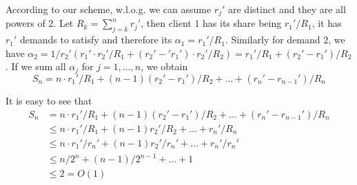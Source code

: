 \documentclass[11pt]{article}
\begin{document}
According to our scheme, w.l.o.g. we can assume $r_j'$ are distinct
and they are all powers of 2. Let $R_k = \sum_{j=k}^n r_j'$, then
client $1$ has its share being $r_1'/R_1$, it has $r_1'$ demands to
satisfy and therefore its $\alpha_1 = r_1'/R_1$. Similarly for demand
$2$, we have $\alpha_2 = 1/r_2' (r_1'\cdot r_2'/R_1 +
(r_2'-'r_1')\cdot r_2'/R_2) = r_1'/R_1 + (r_2'-r_1')/R_2$. If we sum
all $\alpha_j$ for $j=1,\ldots,n$, we obtain
\begin{equation}
S_n = n\cdot r_1'/R_1 + (n-1) (r_2'-r_1')/R_2 + \ldots + (r_n' -
r_{n-1}') / R_n
\end{equation}

It is easy to see that
\begin{align*}
S_n &= n\cdot r_1'/R_1 + (n-1) (r_2'-r_1')/R_2 + \ldots + (r_n' -
r_{n-1}') / R_n\\
&\leq n\cdot r_1'/R_1 + (n-1) r_2' / R_2 + \ldots + r_n' / R_n\\
&\leq n\cdot r_1'/r_n' + (n-1) r_2' / r_n' + \ldots + r_n' / r_n'\\
&\leq n/2^n + (n-1)/2^{n-1} + \ldots + 1\\
&\leq 2 = O(1)\\
\end{align*}
\end{document}
